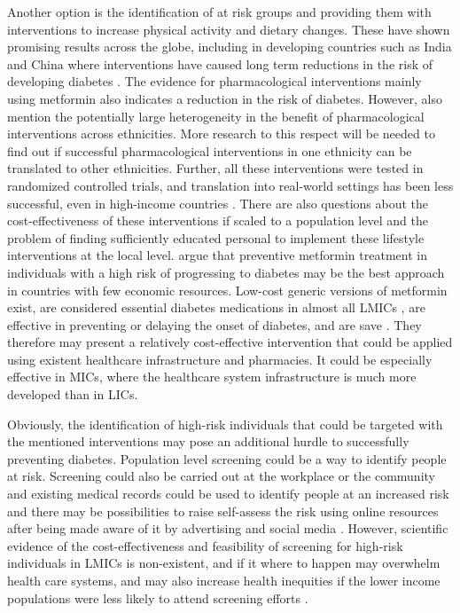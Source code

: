 Another option is the identification of at risk groups and providing them with interventions to increase physical activity and dietary changes. These have shown promising results across the globe, including in developing countries such as India and China where interventions have caused long term reductions in the risk of developing diabetes \parencite{Cefalu2016}. The evidence for pharmacological interventions mainly using metformin also indicates a reduction in the risk of diabetes. However, \textcite{Cefalu2016} also mention the potentially large heterogeneity in the benefit of pharmacological interventions across ethnicities. More research to this respect will be needed to find out if successful pharmacological interventions in one ethnicity can be translated to other ethnicities. Further, all these interventions were tested in randomized controlled trials, and translation into real-world settings has been less successful, even in high-income countries \parencite{Wareham2016}. There are also questions about the cost-effectiveness of these interventions if scaled to a population level and the problem of finding sufficiently educated personal to implement these lifestyle interventions at the local level. \textcite{Cefalu2016} argue that preventive metformin treatment in individuals with a high risk of progressing to diabetes may be the best approach in countries with few economic resources. Low-cost generic versions of metformin exist, are considered essential diabetes medications in almost all \acp{LMIC} \parencite{Bazargani2014}, are effective in preventing or delaying the onset of diabetes, and are save \parencite{Gomes2013}. They therefore may present a relatively cost-effective intervention that could be applied using existent healthcare infrastructure and pharmacies. It could be especially effective in \acp{MIC}, where the healthcare system infrastructure is much more developed than in \acp{LIC}.

Obviously, the identification of high-risk individuals that could be targeted with the mentioned interventions may pose an additional hurdle to successfully preventing diabetes. Population level screening could be a way to identify people at risk. Screening could also be carried out at the workplace or the community and existing medical records could be used to identify people at an increased risk and there may be possibilities to raise self-assess the risk using online resources after being made aware of it by advertising and social media \parencite{Cefalu2016}. However, scientific evidence of the cost-effectiveness and feasibility of screening for high-risk individuals in \acp{LMIC} is non-existent, and if it where to happen may overwhelm health care systems, and may also increase health inequities if the lower income populations were less likely to attend screening efforts \parencite{Wareham2016}.


